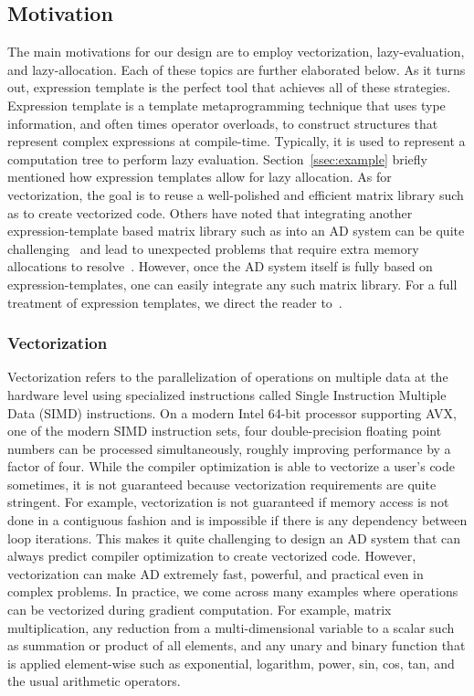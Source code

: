 \subsection{Motivation}\label{ssec:motivation}

The main motivations for our design are to employ vectorization, lazy-evaluation, and lazy-allocation.
Each of these topics are further elaborated below.
As it turns out, expression template is the perfect tool that achieves
all of these strategies.
Expression template is a template metaprogramming technique that 
uses type information, and often times operator overloads, to 
construct structures that represent complex expressions at compile-time.
Typically, it is used to represent a computation tree to perform lazy evaluation.
Section~\ref{ssec:example} briefly mentioned how expression templates allow for
lazy allocation.
As for vectorization, the goal is to reuse a well-polished and efficient
matrix library such as  to create vectorized code.
Others have noted that integrating another expression-template based matrix library 
such as  into an AD system can be quite challenging~\cite{hogan:2014}
and lead to unexpected problems that require extra memory allocations to resolve~\cite{carpenter:2015}.
However, once the AD system itself is fully based on expression-templates,
one can easily integrate any such matrix library.
For a full treatment of expression templates, 
we direct the reader to~\cite{vandevoorde:2002}.

\subsubsection{Vectorization}

Vectorization refers to the parallelization of operations on multiple data at the hardware level 
using specialized instructions called Single Instruction Multiple Data (SIMD) instructions.
On a modern Intel 64-bit processor supporting AVX, one of the modern SIMD instruction sets,
four double-precision floating point numbers can be processed simultaneously,
roughly improving performance by a factor of four.
While the compiler optimization is able to vectorize a user's code sometimes, it is not guaranteed
because vectorization requirements are quite stringent. 
For example, vectorization is not guaranteed if memory access is not done in a contiguous fashion
and is impossible if there is any dependency between loop iterations.
This makes it quite challenging to design an AD system that 
can always predict compiler optimization to create vectorized code.
However, vectorization can make AD extremely fast, powerful, and practical even in complex problems.
In practice, we come across many examples where operations can be vectorized during gradient computation.
For example, matrix multiplication, any reduction from a multi-dimensional variable to a scalar such as
summation or product of all elements, and any unary and binary function that is applied element-wise such as
exponential, logarithm, power, sin, cos, tan, and the usual arithmetic operators.

